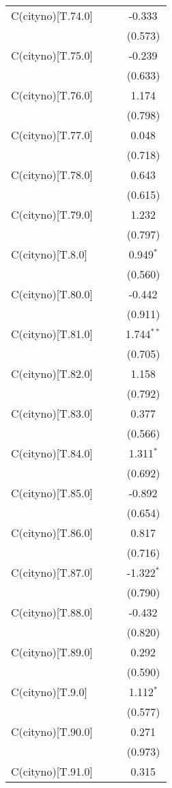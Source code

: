 \begin{table}[!htbp]
\begin{tabular}{@{\extracolsep{5pt}}lccc}
 C(cityno)[T.74.0] & & & -0.333$^{}$ \\
& & & (0.573) \\
 C(cityno)[T.75.0] & & & -0.239$^{}$ \\
& & & (0.633) \\
 C(cityno)[T.76.0] & & & 1.174$^{}$ \\
& & & (0.798) \\
 C(cityno)[T.77.0] & & & 0.048$^{}$ \\
& & & (0.718) \\
 C(cityno)[T.78.0] & & & 0.643$^{}$ \\
& & & (0.615) \\
 C(cityno)[T.79.0] & & & 1.232$^{}$ \\
& & & (0.797) \\
 C(cityno)[T.8.0] & & & 0.949$^{*}$ \\
& & & (0.560) \\
 C(cityno)[T.80.0] & & & -0.442$^{}$ \\
& & & (0.911) \\
 C(cityno)[T.81.0] & & & 1.744$^{**}$ \\
& & & (0.705) \\
 C(cityno)[T.82.0] & & & 1.158$^{}$ \\
& & & (0.792) \\
 C(cityno)[T.83.0] & & & 0.377$^{}$ \\
& & & (0.566) \\
 C(cityno)[T.84.0] & & & 1.311$^{*}$ \\
& & & (0.692) \\
 C(cityno)[T.85.0] & & & -0.892$^{}$ \\
& & & (0.654) \\
 C(cityno)[T.86.0] & & & 0.817$^{}$ \\
& & & (0.716) \\
 C(cityno)[T.87.0] & & & -1.322$^{*}$ \\
& & & (0.790) \\
 C(cityno)[T.88.0] & & & -0.432$^{}$ \\
& & & (0.820) \\
 C(cityno)[T.89.0] & & & 0.292$^{}$ \\
& & & (0.590) \\
 C(cityno)[T.9.0] & & & 1.112$^{*}$ \\
& & & (0.577) \\
 C(cityno)[T.90.0] & & & 0.271$^{}$ \\
& & & (0.973) \\
 C(cityno)[T.91.0] & & & 0.315$^{}$ \\

\end{tabular}
\end{table}
